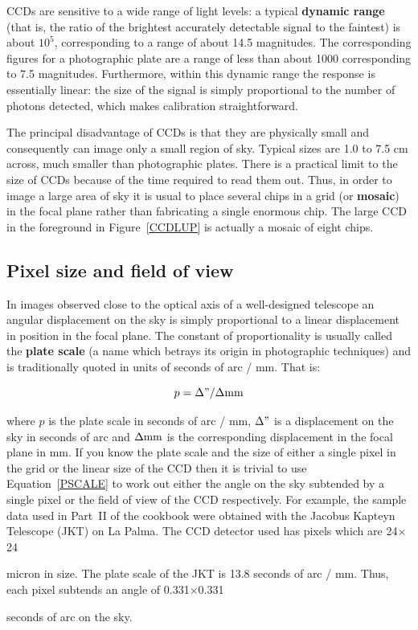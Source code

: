 \documentclass[twoside,11pt]{article}
\newcommand{\html}[1]{}
\newcommand{\latex}[1]{#1}
\newcommand{\xlabel}[1]{}
\begin{document}
CCDs are sensitive to a wide range of light levels: a typical {\bf
dynamic range} (that is, the ratio of the brightest accurately detectable
signal to the faintest) is about $10^{5}$, corresponding to a range of
about 14.5 magnitudes.  The corresponding figures for a photographic plate
are a range of less than about 1000 corresponding to 7.5 magnitudes.
Furthermore, within this dynamic range the response is essentially linear:
the size of the signal is simply proportional to the number of photons
detected, which makes calibration straightforward.

The principal disadvantage of CCDs is that they are physically small and
consequently can image only a small region of sky.  Typical sizes are
1.0 to 7.5 cm across, much smaller than photographic plates.  There is
a practical limit to the size of CCDs because of the time required to read
them out.  Thus, in order to image a large area of sky it is usual to
place several chips in a grid (or {\bf mosaic}) in the focal plane rather
than fabricating a single enormous chip.  The large CCD in the foreground
in Figure~\ref{CCDLUP} is actually a mosaic of eight chips.

\subsection{\xlabel{PLATESCALE}Pixel size and field of view}

In images observed close to the optical axis of a well-designed telescope
an angular displacement on the sky is simply proportional to a linear
displacement in position in the focal plane.  The constant of
proportionality is usually called the {\bf plate scale} (a name which
betrays its origin in photographic techniques) and is traditionally
quoted in units of seconds of arc / mm.  That is:

\begin{equation}
p = \Delta " / \Delta {\rm mm}  \label{PSCALE}
\end{equation}

where $p$ is the plate scale in seconds of arc / mm, $\Delta "$ is a
displacement on the sky in seconds of arc and $\Delta {\rm mm}$ is the
corresponding displacement in the focal plane in mm.  If you know the plate
scale and the size of either a single pixel in the grid or the linear size
of the CCD then it is trivial to use Equation~\ref{PSCALE} to work out
either the angle on the sky subtended by a single pixel or the field of
view of the CCD respectively.  For example, the sample data used in Part~II
of the cookbook were obtained with the Jacobus Kapteyn Telescope (JKT) on
La Palma.  The CCD detector used has pixels which are
\latex{24$\times$24}
\html{24x24}
micron in size.
The plate scale of the JKT is 13.8 seconds of arc / mm.  Thus, each
pixel subtends an angle of
\latex{0.331$\times$0.331 }
\html{0.331x0.331 }
seconds of arc on the sky.
\end{document}
